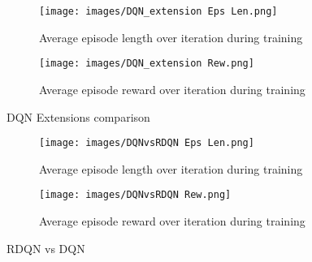 \documentclass{article}
\begin{document}
\begin{figure}[h!]
    \centering
    \begin{subfigure}{0.9\textwidth}
        \centering
        \texttt{[image: images/DQN\_extension Eps Len.png]}
        \caption{Average episode length over iteration during training}
        \label{fig:DQN_extensions-episode}
    \end{subfigure}
    \begin{subfigure}{0.9\textwidth}
        \centering
        \texttt{[image: images/DQN\_extension Rew.png]}
        \caption{Average episode reward over iteration during training}
        \label{fig::DQN_extensions-reward}
    \end{subfigure}
    \caption{DQN Extensions comparison}
    \label{fig:DQN_extensions}
\end{figure}

\begin{figure}[h!]
    \centering
    \begin{subfigure}{0.9\textwidth}
        \centering
        \texttt{[image: images/DQNvsRDQN Eps Len.png]}
        \caption{Average episode length over iteration during training}
        \label{fig:RDQN-episode}
    \end{subfigure}
    \begin{subfigure}{0.9\textwidth}
        \centering
        \texttt{[image: images/DQNvsRDQN Rew.png]}
        \caption{Average episode reward over iteration during training}
        \label{fig::RDQN-reward}
    \end{subfigure}
    \caption{RDQN vs DQN}
    \label{fig:Rainbow DQN}
\end{figure}
\end{document}
